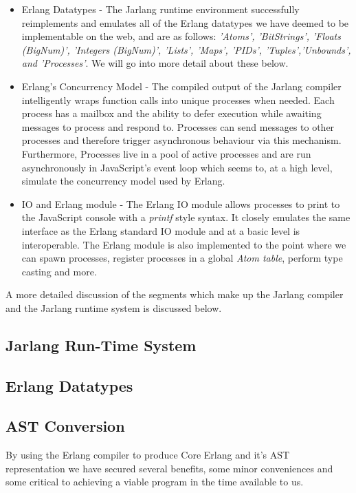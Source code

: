 \documentclass[twoside,12pt,titlepage,a4paper]{article}
\begin{document}
\begin{itemize}
\item Erlang Datatypes - The Jarlang runtime environment successfully reimplements and emulates all of the Erlang datatypes we have deemed to be implementable on the web, and are as follows: \textit{'Atoms', 'BitStrings', 'Floats (BigNum)', 'Integers (BigNum)', 'Lists', 'Maps', 'PIDs', 'Tuples','Unbounds', and 'Processes'}. We will go into more detail about these below.
\item Erlang's Concurrency Model - The compiled output of the Jarlang compiler intelligently wraps function calls into unique processes when needed. Each process has a mailbox and the ability to defer execution while awaiting messages to process and respond to. Processes can send messages to other processes and therefore trigger asynchronous behaviour via this mechanism. Furthermore, Processes live in a pool of active processes and are run asynchronously in JavaScript's event loop which seems to, at a high level, simulate the concurrency model used by Erlang.
\item IO and Erlang module - The Erlang IO module allows processes to print to the JavaScript console with a \textit{printf} style syntax. It closely emulates the same interface as the Erlang standard IO module and at a basic level is interoperable. The Erlang module is also implemented to the point where we can spawn processes, register processes in a global \textit{Atom table}, perform type casting and more.
\end{itemize}

A more detailed discussion of the segments which make up the Jarlang compiler and the Jarlang runtime system is discussed below.

\subsection{Jarlang Run-Time System}

\subsection{Erlang Datatypes}
\subsection{AST Conversion}
By using the Erlang compiler to produce Core Erlang and it's AST representation we have secured several benefits, some minor conveniences and some critical to achieving a viable program in the time available to us.
\end{document}
